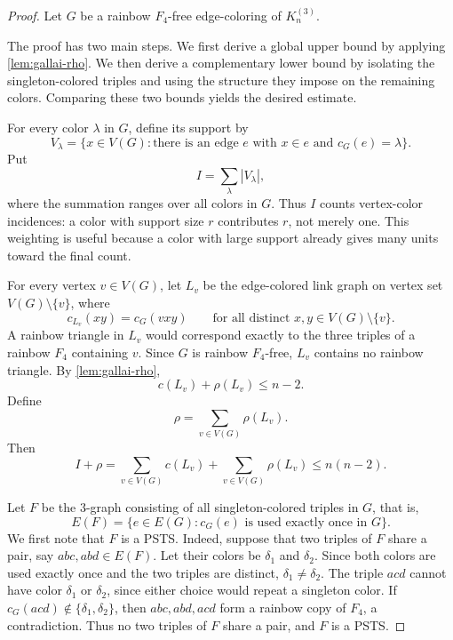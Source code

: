 \documentclass[10pt,a4paper]{article}
\theoremstyle{definition}
\begin{document}
\begin{proof}
    Let $G$ be a rainbow $F_4$-free edge-coloring of $K_n^{(3)}$.

    The proof has two main steps.  We first derive a global upper bound by
    applying \cref{lem:gallai-rho}.
    We then derive a complementary lower bound by isolating the singleton-colored triples and using the structure they impose on the remaining colors.
    Comparing these two bounds yields the desired estimate.

    For every color $\lambda$ in $G$, define its support by
    \[
        V_\lambda=\{x\in V(G)\colon \text{there is an edge } e \text{ with } x\in e \text{ and } c_G(e)=\lambda\}.
    \]
    Put
    \[
        I=\sum_\lambda |V_\lambda|,
    \]
    where the summation ranges over all colors in $G$.
    Thus $I$ counts vertex-color incidences: a color with support size $r$ contributes $r$, not merely one.
    This weighting is useful because a color with large support already gives many units toward the final count.

    For every vertex $v\in V(G)$, let $L_v$ be the edge-colored link graph on vertex set $V(G)\setminus\{v\}$, where
    \[
        c_{L_v}(xy)=c_G(vxy)
        \qquad\text{for all distinct }x,y\in V(G)\setminus\{v\}.
    \]
    A rainbow triangle in $L_v$ would correspond exactly to the three triples of a rainbow $F_4$ containing $v$.
    Since $G$ is rainbow $F_4$-free, $L_v$ contains no rainbow triangle.
    By \cref{lem:gallai-rho},
    \[
        c(L_v)+\rho(L_v)\le n-2.
    \]
    Define
    \[
        \rho=\sum_{v\in V(G)}\rho(L_v).
    \]
    Then
    \begin{equation}\label{eq:I-rho-upper}
        I+\rho
        =
        \sum_{v\in V(G)}c(L_v)+\sum_{v\in V(G)}\rho(L_v)
        \le n(n-2).
    \end{equation}

    Let $F$ be the $3$-graph consisting of all singleton-colored triples in $G$, that is,
    \[
        E(F)=\{e\in E(G)\colon c_G(e)\text{ is used exactly once in }G\}.
    \]
    We first note that $F$ is a PSTS.
    Indeed, suppose that two triples of $F$ share a pair, say $abc,abd\in E(F)$.
    Let their colors be $\delta_1$ and $\delta_2$.  Since both colors are used
    exactly once and the two triples are distinct, $\delta_1\ne\delta_2$.
    The triple $acd$ cannot have color $\delta_1$ or $\delta_2$, since either
    choice would repeat a singleton color.
    If $c_G(acd)\notin\{\delta_1,\delta_2\}$, then $abc,abd,acd$ form a rainbow copy of $F_4$, a contradiction.
    Thus no two triples of
    $F$ share a pair, and $F$ is a PSTS.


\end{proof}
\end{document}
